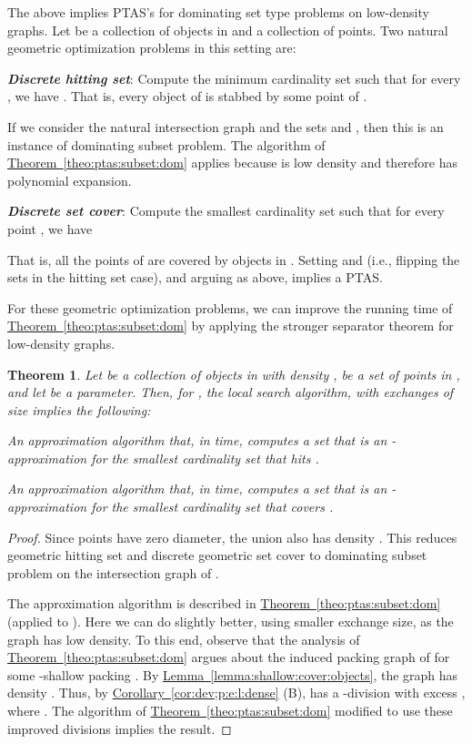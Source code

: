 \documentclass[12pt]{article}
\newcommand{\Term}[1]{\textsf{#1}}
\newcommand{\emphic}[2]{\textcolor{blue25}{\textbf{\emph{#1}}}\index{#2}}
\renewcommand{\emphic}[2]{\textbf{\emph{#1}}}
\newcommand{\emphi}[1]{\emphic{#1}{#1}}
\newtheorem{theorem}{Theorem}\newtheorem{lemma}[theorem]{Lemma}\newtheorem*{restate*}[theorem]{Restatement of }\newtheorem{corollary}[theorem]{Corollary}
\theoremstyle{remark}\theoremheaderfont{\sf}\theorembodyfont{\upshape}
\numberwithin{figure}{section}\numberwithin{table}{section}\numberwithin{equation}{section}
\newcommand{\HLinkShort}[2]{\hyperref[#2]{#1\ref*{#2}}}
\newcommand{\HLink}[2]{\hyperref[#2]{#1~\ref*{#2}}}
\newcommand{\HLinkPage}[2]{\hyperref[#2]{#1~\ref*{#2}}}
\newcommand{\corref}[1]{\HLink{Corollary}{cor:#1}}\newcommand{\correfshort}[1]{\HLinkShort{C}{cor:#1}}\newcommand{\correfpage}[1]{\HLinkPage{Corollary}{cor:#1}}
\newcommand{\lemref}[1]{\HLink{Lemma}{lemma:#1}}
\newcommand{\thmlab}[1]{{\label{theo:#1}}}
\newcommand{\thmref}[1]{\HLink{Theorem}{theo:#1}}
\newcommand{\PTAS}{\Term{PTAS}\xspace}
\begin{document}
The above implies \PTAS's for dominating set type problems on
low-density graphs.  Let  be a collection of objects in
 and  a collection of points.  Two natural geometric
optimization problems in this setting are:
\begin{compactenum}[\;\;(A)]
\item \emphi{Discrete hitting set}: Compute the minimum cardinality
  set  such that for every
  , we have .
  That is, every object of  is stabbed by some point of
  .

  If we consider the natural intersection graph
   and the sets
   and , then this is an
  instance of dominating subset problem. The algorithm of
  \thmref{ptas:subset:dom} applies because  is low density and
  therefore has polynomial expansion.


\item \emphi{Discrete set cover}: Compute the smallest cardinality set
   such that for every point
  , we have
  
  That is, all the points of  are covered by objects in
  . Setting  and 
  (i.e., flipping the sets in the hitting set case), and arguing as
  above, implies a \PTAS.
\end{compactenum}
\smallskip For these geometric optimization problems, we can improve the running
time of \thmref{ptas:subset:dom} by applying the stronger separator
theorem for low-density graphs.
\begin{theorem}
  \thmlab{g:hitting:set:cover}Let  be a collection of  objects in  with density
  ,  be a set of  points in , and let
   be a parameter. Then, for
  , the local search algorithm,
  with exchanges of size  implies the following:
  \begin{compactenum}[\quad(A)]
  \item An approximation algorithm that, in 
    time, computes a set  that is an
    -approximation for the smallest cardinality set that
    hits .

  \item An approximation algorithm that, in 
    time, computes a set  that is an
    -approximation for the smallest cardinality set that
    covers .
  \end{compactenum}
\end{theorem}

\begin{proof}
  Since points have zero diameter, the union 
  also has density . This reduces geometric hitting set
  and discrete geometric set cover to dominating subset problem on the
  intersection graph of .

  The approximation algorithm is described in \thmref{ptas:subset:dom}
  (applied to ). Here we can do slightly better, using smaller
  exchange size, as the graph  has low density. To this end,
  observe that the analysis of \thmref{ptas:subset:dom} argues about
  the induced packing graph of  for some -shallow
  packing . By \lemref{shallow:cover:objects}, the graph
   has density
  .  Thus, by
  \corref{dev;p:e:l:dense} (B),  has a -division
  with excess , where
  .  The algorithm of
  \thmref{ptas:subset:dom} modified to use these improved divisions
  implies the result.
\end{proof}
\end{document}
